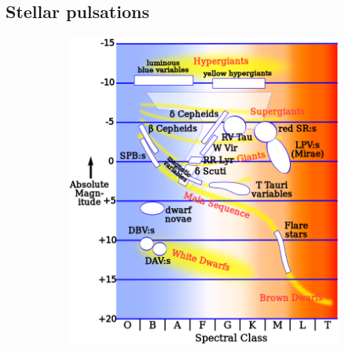         \subsection{Stellar pulsations}
        \label{stellar_pulsations}
        \begin{figure}[H]
        \centering
        \begin{subfigure}{.45\textwidth}
            \centering
            \includegraphics[width=\textwidth]{report/images/chap2_foundations/HR-vartype.png}
        \end{subfigure}%
        \hspace{1em}
        \begin{subfigure}{.45\textwidth}
            \centering

\end{subfigure}
\end{figure}
